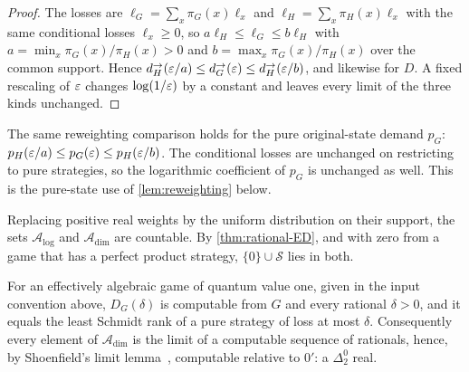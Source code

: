\begin{proof}
The losses are $\ell_G=\sum_x\pi_G(x)\ell_x$ and $\ell_H=\sum_x\pi_H(x)\ell_x$ with the same conditional losses $\ell_x\ge0$, so $a\ell_H\le\ell_G\le
b\ell_H$ with $a=\min_x\pi_G(x)/\pi_H(x)>0$ and $b=\max_x\pi_G(x)/\pi_H(x)$ over the common support. Hence
$d_H^\to(\varepsilon/a)\le d_G^\to(\varepsilon)\le d_H^\to(\varepsilon/b)$, and likewise for $D$. A fixed rescaling of $\varepsilon$ changes $\log(1/\varepsilon)$ by a constant
and leaves every limit of the three kinds unchanged.
\end{proof}

The same reweighting comparison holds for the pure original-state demand $p_G$: $p_H(\varepsilon/a)\le p_G(\varepsilon)\le p_H(\varepsilon/b)$. The conditional losses are unchanged on restricting to pure strategies, so the logarithmic coefficient of $p_G$ is unchanged as well. This is the pure-state use of \cref{lem:reweighting} below.

Replacing positive real weights by the uniform distribution on their support, the sets $\mathcal A_{\log}$ and $\mathcal A_{\dim}$ are countable.
By \cref{thm:rational-ED}, and with zero from a game that has a perfect product strategy, $\{0\}\cup\mathcal S$ lies in both.

\begin{proposition}\label{prop:arithmetic-dim}
For an effectively algebraic game of quantum value one, given in the input convention above, $D_G(\delta)$ is computable from $G$ and every
rational $\delta>0$, and it equals the least Schmidt rank of a pure strategy of loss at most $\delta$. Consequently every element of
$\mathcal A_{\dim}$ is the limit of a computable sequence of rationals, hence, by Shoenfield's limit lemma~\cite{Sho59}, computable relative to
$0'$: a $\Delta^0_2$ real.
\end{proposition}

